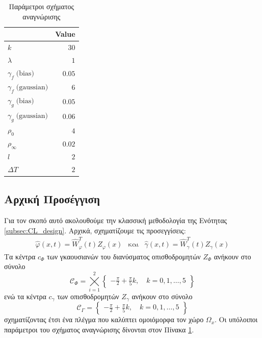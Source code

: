 {  %
	\begin{table}
		\centering
		\captionsetup{format=plain}
		\caption{ Παράμετροι σχήματος αναγνώρισης}
		\label{tab:robot_equiv_schema_params}
		\begin{tabular}{ l | r }
			\hline\hline
			\text{Parameter} & Value \\ \hline\hline
			$k$             & $30$   \\ \hline
			$\lambda$       & $1 $   \\ \hline
			$\gamma_{f} \;\text{(bias)}$        & $0.05$ \\ \hline
			$\gamma_{f} \;\text{(gaussian)}$    & $6$ \\ \hline
			$\gamma_{g} \;\text{(bias)}$        & $0.05$  \\ \hline
			$\gamma_{g} \;\text{(gaussian)}$    & $0.06$ \\ \hline
			$\rho_0      $ & $4$  \\ \hline
			$\rho_\infty $ & $0.02$  \\ \hline
			$l           $ & $2$  \\ \hline
			$\textit{ΔΤ}$   & $2$ 	\\ \hline \hline	
		\end{tabular}
	\end{table}


	\subsection{Αρχική Προσέγγιση}
	\label{subsec:robot_like_init_approach}
	Για τον σκοπό αυτό ακολουθούμε την κλασσική μεθοδολογία της 
	Ενότητας \ref{subsec:CL_design}. Αρχικά, σχηματίζουμε τις προσεγγίσεις:
	\begin{equation*}
	\begin{matrix}
	\hat{\varphi}(x,t)  = \hat{W}_{\varphi}^T(t) Z_\varphi(x) & \text{και} & \hat{\gamma}(x,t) = \hat{W}_{\gamma}^T(t) Z_\gamma(x) 
	\end{matrix}
	\end{equation*}
	Τα κέντρα $c_\Phi$ των γκαουσιανών του διανύσματος οπισθοδρομητών $Z_\Phi$ ανήκουν στο σύνολο
	\begin{equation*}
	\mathcal{C}_\Phi = \bigtimes\limits_{i=1}^{2}  \begin{Bmatrix}
	-\frac{\pi}{2} + \frac{\pi}{5} k, \quad  k = 0,1,\dots,5
	\end{Bmatrix}
	\end{equation*}
	ενώ τα κέντρα $c_\gamma$ των οπισθοδρομητών $Z_\gamma$ ανήκουν στο σύνολο
	\begin{equation*}
	\mathcal{C}_\Gamma = \begin{Bmatrix}
	-\frac{\pi}{2} + \frac{\pi}{5} k, \quad  k = 0,1,\dots,5
	\end{Bmatrix}
	\end{equation*}
	σχηματίζοντας έτσι ένα πλέγμα που καλύπτει ομοιόμορφα τον χώρο $\Omega_x$. Οι υπόλοιποι παράμετροι του σχήματος αναγνώρισης δίνονται στον Πίνακα \ref{tab:robot_equiv_schema_params}.
	
}


